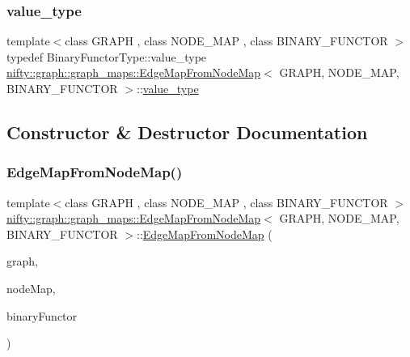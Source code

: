 \subsubsection{\texorpdfstring{value\+\_\+type}{value\_type}}
{\footnotesize\ttfamily template$<$class G\+R\+A\+PH , class N\+O\+D\+E\+\_\+\+M\+AP , class B\+I\+N\+A\+R\+Y\+\_\+\+F\+U\+N\+C\+T\+OR $>$ \\
typedef Binary\+Functor\+Type\+::value\+\_\+type \hyperlink{classnifty_1_1graph_1_1graph__maps_1_1EdgeMapFromNodeMap}{nifty\+::graph\+::graph\+\_\+maps\+::\+Edge\+Map\+From\+Node\+Map}$<$ G\+R\+A\+PH, N\+O\+D\+E\+\_\+\+M\+AP, B\+I\+N\+A\+R\+Y\+\_\+\+F\+U\+N\+C\+T\+OR $>$\+::\hyperlink{classnifty_1_1graph_1_1graph__maps_1_1EdgeMapFromNodeMap_abc24027c855755008ba3694cc49999c2}{value\+\_\+type}}



\subsection{Constructor \& Destructor Documentation}
\mbox{\label{classnifty_1_1graph_1_1graph__maps_1_1EdgeMapFromNodeMap_abf8972db1d22bc00d2afd5cf5cb0b6a3}} 
\subsubsection{\texorpdfstring{Edge\+Map\+From\+Node\+Map()}{EdgeMapFromNodeMap()}}
{\footnotesize\ttfamily template$<$class G\+R\+A\+PH , class N\+O\+D\+E\+\_\+\+M\+AP , class B\+I\+N\+A\+R\+Y\+\_\+\+F\+U\+N\+C\+T\+OR $>$ \\
\hyperlink{classnifty_1_1graph_1_1graph__maps_1_1EdgeMapFromNodeMap}{nifty\+::graph\+::graph\+\_\+maps\+::\+Edge\+Map\+From\+Node\+Map}$<$ G\+R\+A\+PH, N\+O\+D\+E\+\_\+\+M\+AP, B\+I\+N\+A\+R\+Y\+\_\+\+F\+U\+N\+C\+T\+OR $>$\+::\hyperlink{classnifty_1_1graph_1_1graph__maps_1_1EdgeMapFromNodeMap}{Edge\+Map\+From\+Node\+Map} (\begin{DoxyParamCaption}\item[{const \hyperlink{classnifty_1_1graph_1_1graph__maps_1_1EdgeMapFromNodeMap_a551dfc3ef2c5293f5306420d129da574}{Graph\+Type} \&}]{graph,  }\item[{\hyperlink{classnifty_1_1graph_1_1graph__maps_1_1EdgeMapFromNodeMap_ad2639421843e9da9afe18b0b35a7317e}{Node\+Map\+Type}}]{node\+Map,  }\item[{\hyperlink{classnifty_1_1graph_1_1graph__maps_1_1EdgeMapFromNodeMap_a0fbb6e9a54ecf31d27e13db4f274a6d1}{Binary\+Functor\+Type}}]{binary\+Functor }\end{DoxyParamCaption})\hspace{0.3cm}{\ttfamily [inline]}}




